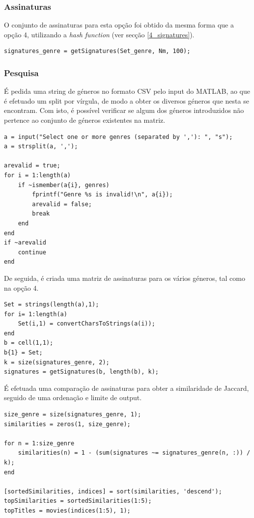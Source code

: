 \documentclass[portuguese, 11pt, a4paper,titlepage, oneside]{article}
\begin{document}
\subsubsection{Assinaturas}
O conjunto de assinaturas para esta opção foi obtido da mesma forma que a opção 4, utilizando a \textit{hash function} (ver secção \ref{4_signatures}).

\begin{lstlisting}[style=Matlab-editor]
signatures_genre = getSignatures(Set_genre, Nm, 100);
\end{lstlisting}

\subsubsection{Pesquisa}
É pedida uma string de géneros no formato CSV pelo input do MATLAB, ao que é efetuado um split por vírgula, de modo a obter os diversos géneros que nesta se encontram. Com isto, é possível verificar se algum dos géneros introduzidos não pertence ao conjunto de géneros existentes na matriz.

\begin{lstlisting}[style=Matlab-editor]
a = input("Select one or more genres (separated by ','): ", "s");
a = strsplit(a, ',');

arevalid = true;
for i = 1:length(a)
    if ~ismember(a{i}, genres)
        fprintf("Genre %s is invalid!\n", a{i});
        arevalid = false;
        break
    end
end
if ~arevalid
    continue
end
\end{lstlisting}

De seguida, é criada uma matriz de assinaturas para os vários géneros, tal como na opção 4.
\begin{lstlisting}[style=Matlab-editor]
Set = strings(length(a),1);
for i= 1:length(a)
    Set(i,1) = convertCharsToStrings(a(i));
end
b = cell(1,1);
b{1} = Set;
k = size(signatures_genre, 2);
signatures = getSignatures(b, length(b), k);
\end{lstlisting}

É efetuada uma comparação de assinaturas para obter a similaridade de Jaccard, seguido de uma ordenação e limite de output.
\begin{lstlisting}[style=Matlab-editor]
size_genre = size(signatures_genre, 1);
similarities = zeros(1, size_genre);

for n = 1:size_genre
    similarities(n) = 1 - (sum(signatures ~= signatures_genre(n, :)) / k);
end

[sortedSimilarities, indices] = sort(similarities, 'descend');
topSimilarities = sortedSimilarities(1:5);
topTitles = movies(indices(1:5), 1);
\end{lstlisting}
\end{document}
